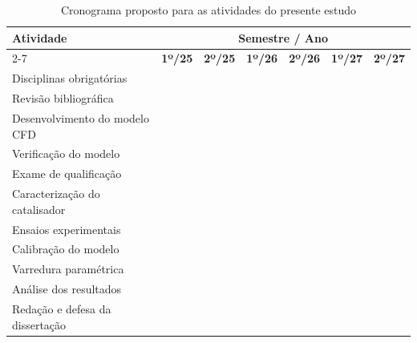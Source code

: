 \begin{table}[htb]
\centering
\caption{Cronograma proposto para as atividades do presente estudo}
\label{tab:cronograma}
\renewcommand{\arraystretch}{1.3}
\begin{tabular}{|l|c|c|c|c|c|c|}
\hline
\multirow{2}{*}{\textbf{Atividade}} & \multicolumn{6}{c|}{\textbf{Semestre / Ano}} \\
\cline{2-7}
 & \textbf{1º/25} & \textbf{2º/25} & \textbf{1º/26} & \textbf{2º/26} & \textbf{1º/27} & \textbf{2º/27} \\
\hline
Disciplinas obrigatórias        & \cellcolor{gray!55} & \cellcolor{gray!55} & \cellcolor{gray!55} & \cellcolor{gray!55} &  &  \\
\hline
Revisão bibliográfica           & \cellcolor{gray!55} & \cellcolor{gray!55} & \cellcolor{gray!55} & \cellcolor{gray!55} & \cellcolor{gray!55} &  \\
\hline
Desenvolvimento do modelo CFD   &  & \cellcolor{gray!55} & \cellcolor{gray!55} & \cellcolor{gray!55} &  &  \\
\hline
Verificação do modelo           &  &  & \cellcolor{gray!55} & \cellcolor{gray!55} &  &  \\
\hline
Exame de qualificação           &  &  &  & \cellcolor{gray!55} &  &  \\
\hline
Caracterização do catalisador   &  &  &  & \cellcolor{gray!55} & \cellcolor{gray!55} &  \\
\hline
Ensaios experimentais           &  &  &  & \cellcolor{gray!55} & \cellcolor{gray!55} &  \\
\hline
Calibração do modelo            &  &  &  &  & \cellcolor{gray!55} &  \\
\hline
Varredura paramétrica           &  &  &  &  & \cellcolor{gray!55} & \cellcolor{gray!55} \\
\hline
Análise dos resultados          &  &  &  &  & \cellcolor{gray!55} & \cellcolor{gray!55} \\
\hline
Redação e defesa da dissertação &  &  &  &  &  & \cellcolor{gray!55} \\
\hline
\end{tabular}
\end{table}

